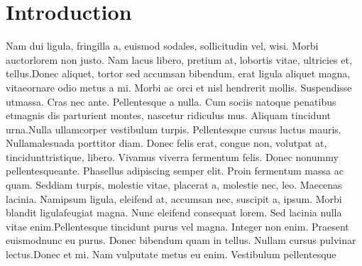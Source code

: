 \documentclass[11pt,a4paper]{article}
\begin{document}
\section{Introduction}
Nam dui ligula, fringilla a, euismod sodales, sollicitudin vel, wisi. Morbi auctorlorem non justo. Nam lacus libero, pretium at, lobortis vitae, ultricies et, tellus.Donec aliquet, tortor sed accumsan bibendum, erat ligula aliquet magna, vitaeornare odio metus a mi. Morbi ac orci et nisl hendrerit mollis. Suspendisse utmassa. Cras nec ante. Pellentesque a nulla. Cum sociis natoque penatibus etmagnis dis parturient montes, nascetur ridiculus mus. Aliquam tincidunt urna.Nulla ullamcorper vestibulum turpis. Pellentesque cursus luctus mauris. Nullamalesuada porttitor diam. Donec felis erat, congue non, volutpat at, tincidunttristique, libero. Vivamus viverra fermentum  felis. Donec nonummy pellentesqueante. Phasellus adipiscing semper elit. Proin fermentum massa ac quam. Seddiam turpis, molestie vitae, placerat a, molestie nec, leo. Maecenas lacinia. Namipsum ligula, eleifend at, accumsan nec, suscipit a, ipsum. Morbi blandit ligulafeugiat magna. Nunc eleifend consequat lorem. Sed lacinia nulla vitae enim.Pellentesque tincidunt purus vel magna. Integer non enim. Praesent euismodnunc eu purus. Donec bibendum quam in tellus. Nullam cursus pulvinar lectus.Donec et mi. Nam vulputate metus eu enim. Vestibulum pellentesque
\end{document}
